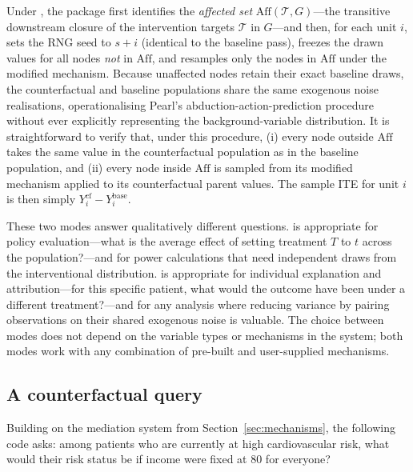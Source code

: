 \documentclass[article]{jss}
\begin{document}
Under , the package first identifies the \emph{affected set}
$\mathrm{Aff}(\mathcal{T}, G)$---the transitive downstream closure of the
intervention targets $\mathcal{T}$ in $G$---and then, for each unit $i$, sets the
RNG seed to $s + i$ (identical to the baseline pass), freezes the drawn values for
all nodes \emph{not} in $\mathrm{Aff}$, and resamples only the nodes in
$\mathrm{Aff}$ under the modified mechanism. Because unaffected nodes retain their
exact baseline draws, the counterfactual and baseline populations share the same
exogenous noise realisations, operationalising Pearl's abduction-action-prediction
procedure \citep{pearl2009causality} without ever explicitly representing the
background-variable distribution. It is straightforward to verify that, under this
procedure, (i) every node outside $\mathrm{Aff}$ takes the same value in the
counterfactual population as in the baseline population, and (ii) every node inside
$\mathrm{Aff}$ is sampled from its modified mechanism applied to its
counterfactual parent values. The sample ITE for unit $i$ is then simply
$Y_i^\mathrm{cf} - Y_i^\mathrm{base}$.

These two modes answer qualitatively different questions.  is
appropriate for policy evaluation---what is the average effect of setting treatment
$T$ to $t$ across the population?---and for power calculations that need
independent draws from the interventional distribution.  is
appropriate for individual explanation and attribution---for this specific patient,
what would the outcome have been under a different treatment?---and for any
analysis where reducing variance by pairing observations on their shared exogenous
noise is valuable. The choice between modes does not depend on the variable types
or mechanisms in the system; both modes work with any combination of pre-built and
user-supplied mechanisms.

\subsection{A counterfactual query}

Building on the mediation system from Section~\ref{sec:mechanisms}, the following
code asks: among patients who are currently at high cardiovascular risk, what would
their risk status be if income were fixed at 80 for everyone?

\end{document}
